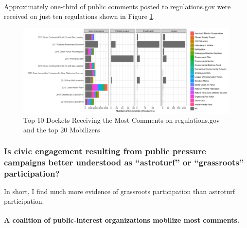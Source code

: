 \documentclass[
      12pt,
        ]{article}
\begin{document}
Approximately one-third of public comments posted to regulations.gov
were received on just ten regulations shown in Figure
\ref{fig:topdockets}.

\begin{figure}

{\centering \includegraphics[width=6.5in]{../Figs/topdockets} 

}

\caption{Top 10 Dockets Receiving the Most Comments on regulations.gov and the top 20 Mobilizers}\label{fig:topdockets}
\end{figure}

\hypertarget{is-civic-engagement-resulting-from-public-pressure-campaigns-better-understood-as-astroturf-or-grassroots-participation}{%
\subsubsection{Is civic engagement resulting from public pressure campaigns better understood as ``astroturf'' or ``grassroots'' participation?}\label{is-civic-engagement-resulting-from-public-pressure-campaigns-better-understood-as-astroturf-or-grassroots-participation}}

In short, I find much more evidence of grassroots participation than astroturf participation.

\hypertarget{a-coalition-of-public-interest-organizations-mobilize-most-comments.}{%
\paragraph{A coalition of public-interest organizations mobilize most comments.}\label{a-coalition-of-public-interest-organizations-mobilize-most-comments.}}
\end{document}
